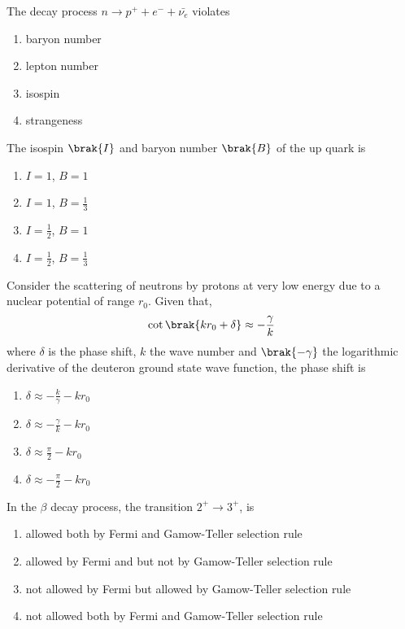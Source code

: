 \item The decay process $n \to p^+ + e^- + \bar{\nu_e}$ violates
\hfill{}
\begin{enumerate}
\item baryon number
\item lepton number
\item isospin
\item strangeness
\end{enumerate}

\item The isospin $\brak{I}$ and baryon number $\brak{B}$ of the up quark is
\hfill{}
\begin{enumerate}
\item $I=1$, $B=1$
\item $I=1$, $B=\frac{1}{3}$
\item $I=\frac{1}{2}$, $B=1$
\item $I=\frac{1}{2}$, $B=\frac{1}{3}$
\end{enumerate}

\item Consider the scattering of neutrons by protons at very low energy due to a nuclear potential of range $r_0$. Given that,
\begin{align*}
\cot\brak{kr_0 + \delta} \approx -\frac{\gamma}{k}
\end{align*}
where $\delta$ is the phase shift, $k$ the wave number and $\brak{-\gamma}$ the logarithmic derivative of the deuteron ground state wave function, the phase shift is
\hfill{}
\begin{enumerate}
\item $\delta \approx -\frac{k}{\gamma} - kr_0$
\item $\delta \approx -\frac{\gamma}{k} - kr_0$
\item $\delta \approx \frac{\pi}{2} - kr_0$
\item $\delta \approx -\frac{\pi}{2} - kr_0$
\end{enumerate}

\item In the $\beta$ decay process, the transition $2^+ \to 3^+$, is
\hfill{}
\begin{enumerate}
\item allowed both by Fermi and Gamow-Teller selection rule
\item allowed by Fermi and but not by Gamow-Teller selection rule
\item not allowed by Fermi but allowed by Gamow-Teller selection rule
\item not allowed both by Fermi and Gamow-Teller selection rule
\end{enumerate}


